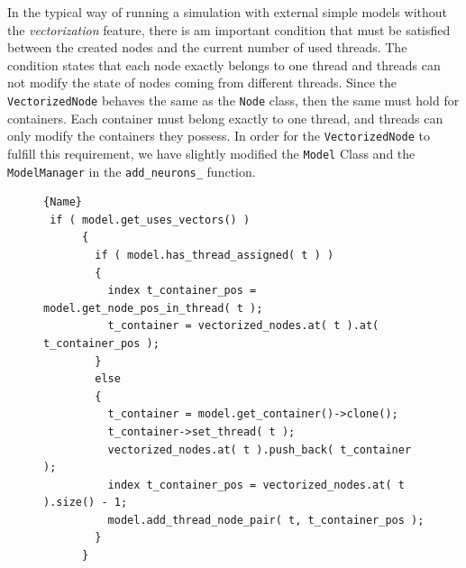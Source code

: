 In the typical way of running a simulation with external simple models without the \emph{vectorization} feature, there is am important condition that must be satisfied between the created nodes and the current number of used threads. The condition states that each node exactly belongs to one thread and threads can not modify the state of nodes coming from different threads. Since the \texttt{VectorizedNode} behaves the same as the \texttt{Node} class, then the same must hold for containers. Each container must belong exactly to one thread, and threads can only modify the containers they possess. In order for the \texttt{VectorizedNode} to fulfill this requirement, we have slightly modified the \texttt{Model} Class and the \texttt{ModelManager} in the \texttt{add\_neurons\_} function.\\


\begin{figure}[ht!]
    \centering
\begin{lstlisting}[caption=Assigning containers to threads,frame=tlrb, label=lst:thread_container]{Name}
 if ( model.get_uses_vectors() )
      {
        if ( model.has_thread_assigned( t ) )
        {
          index t_container_pos = model.get_node_pos_in_thread( t );
          t_container = vectorized_nodes.at( t ).at( t_container_pos );
        }
        else
        {
          t_container = model.get_container()->clone();
          t_container->set_thread( t );
          vectorized_nodes.at( t ).push_back( t_container );
          index t_container_pos = vectorized_nodes.at( t ).size() - 1;
          model.add_thread_node_pair( t, t_container_pos );
        }
      }
      
\end{lstlisting}
\end{figure}


